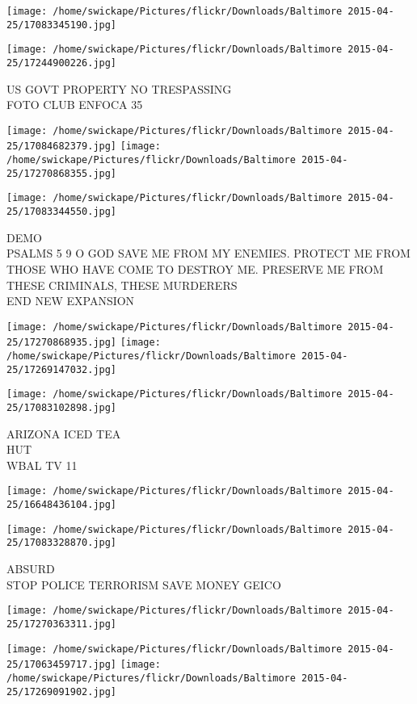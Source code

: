 \documentclass[10pt,letterpaper]{article}
\begin{document}
\texttt{[image: /home/swickape/Pictures/flickr/Downloads/Baltimore 2015-04-25/17083345190.jpg]}

\vspace{0.25in}
\texttt{[image: /home/swickape/Pictures/flickr/Downloads/Baltimore 2015-04-25/17244900226.jpg]}

US GOVT PROPERTY NO TRESPASSING\\
FOTO CLUB ENFOCA 35
\pagebreak

\texttt{[image: /home/swickape/Pictures/flickr/Downloads/Baltimore 2015-04-25/17084682379.jpg]}
\texttt{[image: /home/swickape/Pictures/flickr/Downloads/Baltimore 2015-04-25/17270868355.jpg]}

\vspace{0.25in}
\texttt{[image: /home/swickape/Pictures/flickr/Downloads/Baltimore 2015-04-25/17083344550.jpg]}

DEMO\\
PSALMS 5 9 O GOD SAVE ME FROM MY ENEMIES.  PROTECT ME FROM THOSE WHO HAVE COME TO DESTROY ME.  PRESERVE ME FROM THESE CRIMINALS, THESE MURDERERS\\
END NEW EXPANSION
\pagebreak

\texttt{[image: /home/swickape/Pictures/flickr/Downloads/Baltimore 2015-04-25/17270868935.jpg]}
\texttt{[image: /home/swickape/Pictures/flickr/Downloads/Baltimore 2015-04-25/17269147032.jpg]}

\texttt{[image: /home/swickape/Pictures/flickr/Downloads/Baltimore 2015-04-25/17083102898.jpg]}

ARIZONA ICED TEA\\
HUT\\
WBAL TV 11
\pagebreak

\texttt{[image: /home/swickape/Pictures/flickr/Downloads/Baltimore 2015-04-25/16648436104.jpg]}

\vspace{0.25in}
\texttt{[image: /home/swickape/Pictures/flickr/Downloads/Baltimore 2015-04-25/17083328870.jpg]}

ABSURD\\
STOP POLICE TERRORISM SAVE MONEY GEICO
\pagebreak

\texttt{[image: /home/swickape/Pictures/flickr/Downloads/Baltimore 2015-04-25/17270363311.jpg]}

\vspace{0.25in}
\texttt{[image: /home/swickape/Pictures/flickr/Downloads/Baltimore 2015-04-25/17063459717.jpg]}
\texttt{[image: /home/swickape/Pictures/flickr/Downloads/Baltimore 2015-04-25/17269091902.jpg]}
\end{document}
